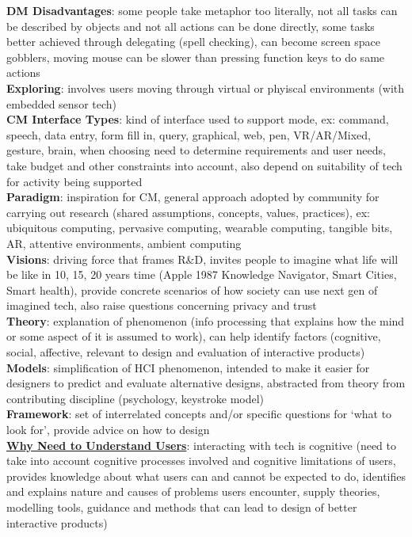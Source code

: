 \documentclass[a4paper]{article}
\begin{document}
\begin{multicols}{2}
        \textbf{DM Disadvantages}: some people take metaphor too literally, not all tasks can be described by objects and not all actions can be done directly, some tasks better achieved through delegating (spell checking), can become screen space gobblers, moving mouse can be slower than pressing function keys to do same actions\\
        \textbf{Exploring}: involves users moving through virtual or phyiscal environments (with embedded sensor tech)\\
        \textbf{CM Interface Types}: kind of interface used to support mode, ex: command, speech, data entry, form fill in, query, graphical, web, pen, VR/AR/Mixed, gesture, brain, when choosing need to determine requirements and user needs, take budget and other constraints into account, also depend on suitability of tech for activity being supported\\
        \textbf{Paradigm}: inspiration for CM, general approach adopted by community for carrying out research (shared assumptions, concepts, values, practices), ex: ubiquitous computing, pervasive computing, wearable computing, tangible bits, AR, attentive environments, ambient computing\\
        \textbf{Visions}: driving force that frames R\&D, invites people to imagine what life will be like in 10, 15, 20 years time (Apple 1987 Knowledge Navigator, Smart Cities, Smart health), provide concrete scenarios of how society can use next gen of imagined tech, also  raise questions concerning privacy and trust\\
        \textbf{Theory}: explanation of phenomenon (info processing that explains how the mind or some aspect of it is assumed to work), can help identify factors (cognitive, social, affective, relevant to design and evaluation of interactive products)\\
        \textbf{Models}: simplification of HCI phenomenon, intended to make it easier for designers to predict and evaluate alternative designs, abstracted from theory from contributing discipline (psychology, keystroke model)\\
        \textbf{Framework}: set of interrelated concepts and/or specific questions for `what to look for', provide advice on how to design\\
        \underline{\textbf{Why Need to Understand Users}}: interacting with tech is cognitive (need to take into account cognitive processes involved and cognitive limitations of users, provides knowledge about what users can and cannot be expected to do, identifies and explains nature and causes of problems users encounter, supply theories, modelling tools, guidance and methods that can lead to design of better interactive products)\\

\end{multicols}
\end{document}
